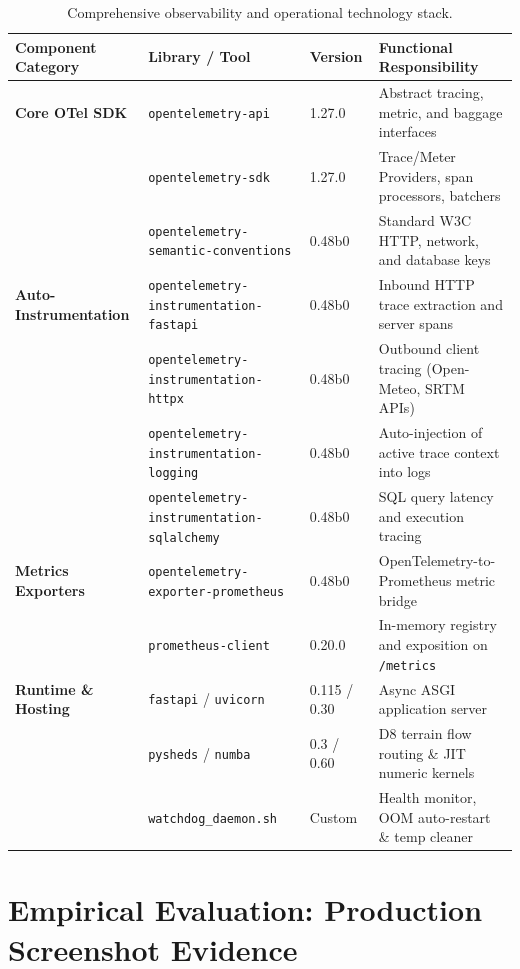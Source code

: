 \documentclass[11pt,a4paper]{article}
\begin{document}
\begin{table}[htbp]
\centering
\small
\begin{tabular}{@{}llll@{}}
\toprule
\textbf{Component Category} & \textbf{Library / Tool} & \textbf{Version} & \textbf{Functional Responsibility} \\ \midrule
\textbf{Core OTel SDK} & \texttt{opentelemetry-api} & 1.27.0 & Abstract tracing, metric, and baggage interfaces \\
& \texttt{opentelemetry-sdk} & 1.27.0 & Trace/Meter Providers, span processors, batchers \\
& \texttt{opentelemetry-semantic-conventions} & 0.48b0 & Standard W3C HTTP, network, and database keys \\ \addlinespace[0.3em]
\textbf{Auto-Instrumentation} & \texttt{opentelemetry-instrumentation-fastapi} & 0.48b0 & Inbound HTTP trace extraction and server spans \\
& \texttt{opentelemetry-instrumentation-httpx} & 0.48b0 & Outbound client tracing (Open-Meteo, SRTM APIs) \\
& \texttt{opentelemetry-instrumentation-logging} & 0.48b0 & Auto-injection of active trace context into logs \\
& \texttt{opentelemetry-instrumentation-sqlalchemy} & 0.48b0 & SQL query latency and execution tracing \\ \addlinespace[0.3em]
\textbf{Metrics Exporters} & \texttt{opentelemetry-exporter-prometheus} & 0.48b0 & OpenTelemetry-to-Prometheus metric bridge \\
& \texttt{prometheus-client} & 0.20.0 & In-memory registry and exposition on \texttt{/metrics} \\ \addlinespace[0.3em]
\textbf{Runtime \& Hosting} & \texttt{fastapi} / \texttt{uvicorn} & 0.115 / 0.30 & Async ASGI application server \\
& \texttt{pysheds} / \texttt{numba} & 0.3 / 0.60 & D8 terrain flow routing \& JIT numeric kernels \\
& \texttt{watchdog\_daemon.sh} & Custom & Health monitor, OOM auto-restart \& temp cleaner \\ \bottomrule
\end{tabular}
\caption{Comprehensive observability and operational technology stack.}
\label{tab:tech_stack}
\end{table}

\section{Empirical Evaluation: Production Screenshot Evidence}
\label{sec:results}
\end{document}

